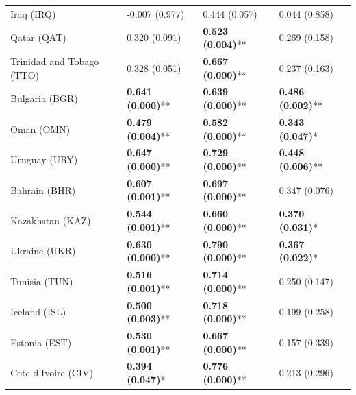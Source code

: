 \begin{longtable}{p{5cm}p{3cm}p{3cm}p{5cm}}
Iraq (IRQ) & \textcolor{atlOrange600}{-0.007 (0.977)} & \textcolor{atlOrange600}{0.444 (0.057)} & \textcolor{atlOrange600}{0.044 (0.858)} \\
Qatar (QAT) & \textcolor{atlOrange600}{0.320 (0.091)} & \textcolor{atlLime600}{\textbf{0.523 (0.004)}**} & \textcolor{atlOrange600}{0.269 (0.158)} \\
Trinidad and Tobago (TTO) & \textcolor{atlOrange600}{0.328 (0.051)} & \textcolor{atlLime600}{\textbf{0.667 (0.000)}**} & \textcolor{atlOrange600}{0.237 (0.163)} \\
Bulgaria (BGR) & \textcolor{atlLime600}{\textbf{0.641 (0.000)}**} & \textcolor{atlLime600}{\textbf{0.639 (0.000)}**} & \textcolor{atlLime600}{\textbf{0.486 (0.002)}**} \\
Oman (OMN) & \textcolor{atlLime600}{\textbf{0.479 (0.004)}**} & \textcolor{atlLime600}{\textbf{0.582 (0.000)}**} & \textcolor{atlLime600}{\textbf{0.343 (0.047)}*} \\
Uruguay (URY) & \textcolor{atlLime600}{\textbf{0.647 (0.000)}**} & \textcolor{atlLime600}{\textbf{0.729 (0.000)}**} & \textcolor{atlLime600}{\textbf{0.448 (0.006)}**} \\
Bahrain (BHR) & \textcolor{atlLime600}{\textbf{0.607 (0.001)}**} & \textcolor{atlLime600}{\textbf{0.697 (0.000)}**} & \textcolor{atlOrange600}{0.347 (0.076)} \\
Kazakhstan (KAZ) & \textcolor{atlLime600}{\textbf{0.544 (0.001)}**} & \textcolor{atlLime600}{\textbf{0.660 (0.000)}**} & \textcolor{atlLime600}{\textbf{0.370 (0.031)}*} \\
Ukraine (UKR) & \textcolor{atlLime600}{\textbf{0.630 (0.000)}**} & \textcolor{atlLime600}{\textbf{0.790 (0.000)}**} & \textcolor{atlLime600}{\textbf{0.367 (0.022)}*} \\
Tunisia (TUN) & \textcolor{atlLime600}{\textbf{0.516 (0.001)}**} & \textcolor{atlLime600}{\textbf{0.714 (0.000)}**} & \textcolor{atlOrange600}{0.250 (0.147)} \\
Iceland (ISL) & \textcolor{atlLime600}{\textbf{0.500 (0.003)}**} & \textcolor{atlLime600}{\textbf{0.718 (0.000)}**} & \textcolor{atlOrange600}{0.199 (0.258)} \\
Estonia (EST) & \textcolor{atlLime600}{\textbf{0.530 (0.001)}**} & \textcolor{atlLime600}{\textbf{0.667 (0.000)}**} & \textcolor{atlOrange600}{0.157 (0.339)} \\
Cote d'Ivoire (CIV) & \textcolor{atlLime600}{\textbf{0.394 (0.047)}*} & \textcolor{atlLime600}{\textbf{0.776 (0.000)}**} & \textcolor{atlOrange600}{0.213 (0.296)} \\

\end{longtable}
